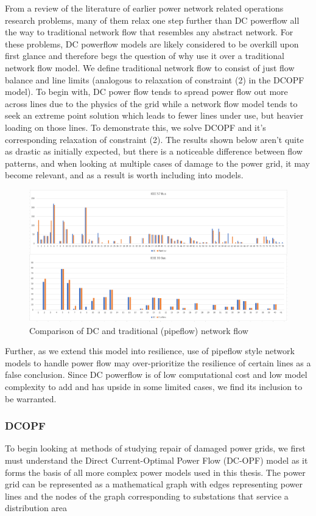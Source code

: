 \documentclass{article}
\begin{document}
	From a review of the literature of earlier power network related operations research problems, many of them relax one step further than DC powerflow all the way to traditional network flow that resembles any abstract network. For these problems, DC powerflow models are likely considered to be overkill upon first glance and therefore begs the question of why use it over a traditional network flow model. We define traditional network flow to consist of just flow balance and line limits (analogous to relaxation of constraint (2) in the DCOPF model). To begin with, DC power flow tends to spread power flow out more across lines due to the physics of the grid while a network flow model tends to seek an extreme point solution which leads to fewer lines under use, but heavier loading on those lines. To demonstrate this, we solve DCOPF and it's corresponding relaxation of constraint (2). The results shown below aren't quite as drastic as initially expected, but there is a noticeable difference between flow patterns, and when looking at multiple cases of damage to the power grid, it may become relevant, and as a result is worth including into models.
	
	\begin{figure}
		\centering
		\includegraphics[width=\linewidth]{DCvsPipeflow.PNG}
		\caption{Comparison of DC and traditional (pipeflow) network flow}
	\end{figure}
	
	Further, as we extend this model into resilience, use of pipeflow style network models to handle power flow may over-prioritize the resilience of certain lines as a false conclusion. Since DC powerflow is of low computational cost and low model complexity to add and has upside in some limited cases, we find its inclusion to be warranted.
	\subsubsection{DCOPF}
		To begin looking at methods of studying repair of damaged power grids, we first must understand the Direct Current-Optimal Power Flow (DC-OPF) model as it forms the basis of all more complex power models used in this thesis. The power grid can be represented as a mathematical graph with edges representing power lines and the nodes of the graph corresponding to substations that service a distribution area
		
\end{document}
